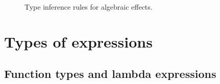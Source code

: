 \begin{figure}[H]

	\caption{Type inference rules for algebraic effects.}
	\label{fig:zilch-staticsem-types-effects-typerules}
\end{figure}

\section{Types of expressions}\label{sec:zilch-staticsem-exprs}

\subsection{Function types and lambda expressions}\label{subsec:zilch-staticsem-exprs-pi}

